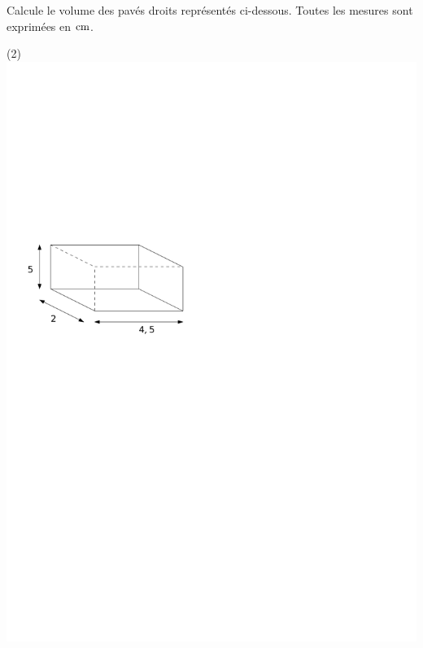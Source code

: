 \documentclass[a4paper,11pt]{report}
\begin{document}
\begin{exo}{
Calcule le volume des pavés droits représentés ci-dessous. Toutes les mesures sont exprimées en $\tunit{}{\centi m}$.

\begin{tasks}[after-item-skip = 0em](2)
    \task ~\\ \includegraphics[scale=0.5]{media/gm-02/pave1.pdf}

\end{tasks}}
\end{exo}
\end{document}

